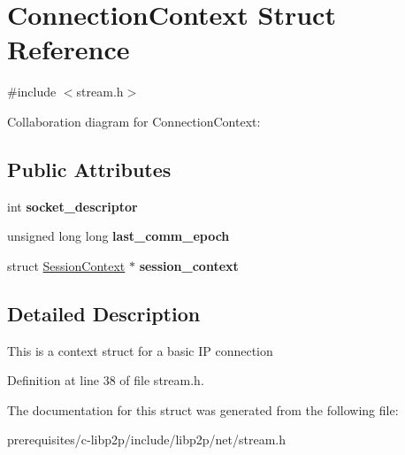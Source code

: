 \hypertarget{struct_connection_context}{}\section{Connection\+Context Struct Reference}
\label{struct_connection_context}


{\ttfamily \#include $<$stream.\+h$>$}



Collaboration diagram for Connection\+Context\+:
\subsection*{Public Attributes}
\begin{DoxyCompactItemize}
\item 
\mbox{\label{struct_connection_context_a86f413e7e9303eea31b7dc68c4cb035e}} 
int {\bfseries socket\+\_\+descriptor}
\item 
\mbox{\label{struct_connection_context_a0f338924e1eefb176573e2ac8ca30c4d}} 
unsigned long long {\bfseries last\+\_\+comm\+\_\+epoch}
\item 
\mbox{\label{struct_connection_context_a86efb3aaa9161edd1ef6fc0c67303584}} 
struct \mbox{\hyperlink{struct_session_context}{Session\+Context}} $\ast$ {\bfseries session\+\_\+context}
\end{DoxyCompactItemize}


\subsection{Detailed Description}
This is a context struct for a basic IP connection 

Definition at line 38 of file stream.\+h.



The documentation for this struct was generated from the following file\+:\begin{DoxyCompactItemize}
\item 
prerequisites/c-\/libp2p/include/libp2p/net/stream.\+h\end{DoxyCompactItemize}
